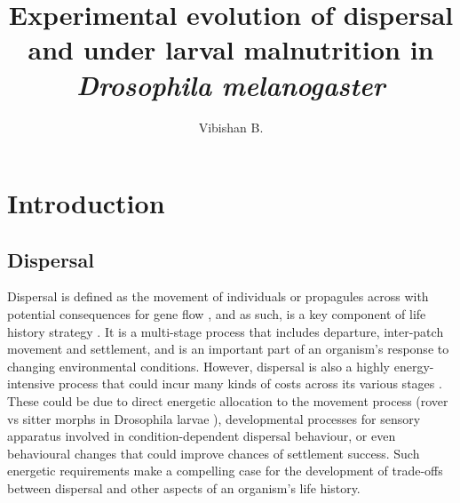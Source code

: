 \documentclass[12pt,onecolumn,twoside]{article}
\author{Vibishan B.}
\affil{Department of Biology, Indian Institute of Science Education and Research (IISER), Pune}
\title{Experimental evolution of dispersal and under larval malnutrition in \textit{Drosophila melanogaster}}
\date{\empty}
\begin{document}
	\maketitle
	\section{Introduction}

	\subsection{Dispersal}
	Dispersal is defined as the movement of individuals or propagules across with potential consequences for gene flow \citep{Ronce2007}, and as such, is a key component of life history strategy \citep{Clobert2012, Bonte2017}. It is a multi-stage process that includes departure, inter-patch movement and settlement, and is an important part of an organism's response to changing environmental conditions. However, dispersal is also a highly energy-intensive process that could incur many kinds of costs across its various stages \citep{Bonte2012}. These could be due to direct energetic allocation to the movement process (rover vs sitter morphs in Drosophila larvae \cite{Vijendravarma2012}), developmental processes for sensory apparatus involved in condition-dependent dispersal behaviour, or even behavioural changes that could improve chances of settlement success. Such energetic requirements make a compelling case for the development of trade-offs between dispersal and other aspects of an organism's life history.
\end{document}

